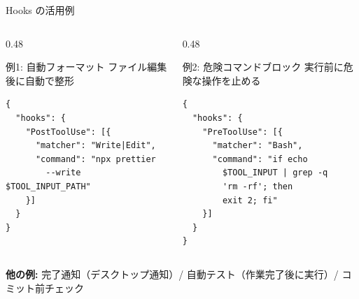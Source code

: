 \documentclass[aspectratio=169, 14pt]{beamer}
\begin{document}
\begin{frame}[fragile]{Hooks の活用例}
  \begin{columns}[T]
    \begin{column}{0.48\textwidth}
      \begin{block}{例1: 自動フォーマット}
        {\scriptsize ファイル編集後に自動で整形}
        \begin{lstlisting}[language={}, numbers=none]
{
  "hooks": {
    "PostToolUse": [{
      "matcher": "Write|Edit",
      "command": "npx prettier
        --write $TOOL_INPUT_PATH"
    }]
  }
}
        \end{lstlisting}
      \end{block}
    \end{column}
    \begin{column}{0.48\textwidth}
      \begin{block}{例2: 危険コマンドブロック}
        {\scriptsize 実行前に危険な操作を止める}
        \begin{lstlisting}[language={}, numbers=none]
{
  "hooks": {
    "PreToolUse": [{
      "matcher": "Bash",
      "command": "if echo
        $TOOL_INPUT | grep -q
        'rm -rf'; then
        exit 2; fi"
    }]
  }
}
        \end{lstlisting}
      \end{block}
    \end{column}
  \end{columns}

  {\scriptsize \textbf{他の例:}
    完了通知（デスクトップ通知）/
    自動テスト（作業完了後に実行）/
    コミット前チェック}
\end{frame}
\end{document}
